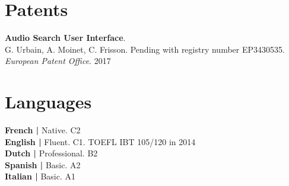 \documentclass[a4paper]{deedy-resume} %
\begin{document}
\begin{minipage}[b]{0.55\linewidth}
	
	
	\section{Patents}
	
	\vspace{5pt}
	\textbf{Audio Search User Interface}.\\
	G. Urbain, A. Moinet, C. Frisson. Pending with registry number EP3430535. \textit{European Patent Office}. 2017
	
	\vspace{26pt}
	
\end{minipage}
\hfill
\begin{minipage}[b]{0.42\linewidth}
	
	
	\section{Languages}
	\vspace{5pt}
	
	\hspace{0.1pt} \textbf{French  \hspace{7pt} | \hspace{2pt}} Native. C2\\
	\vspace{1pt}
	\textbf{English   \hspace{8.8pt}| \hspace{2pt}}  Fluent. C1. TOEFL IBT 105/120 in 2014\\
	\vspace{1pt}
	\textbf{Dutch  \hspace{10.5pt} | \hspace{2pt}}  Professional. B2\\
	\vspace{1pt}
	\textbf{Spanish  \hspace{3.6pt} | \hspace{2pt}} Basic. A2\\
	\vspace{1pt}
	\textbf{Italian  \hspace{10.1pt} | \hspace{2pt}}  Basic. A1
	
\end{minipage}
\end{document}
